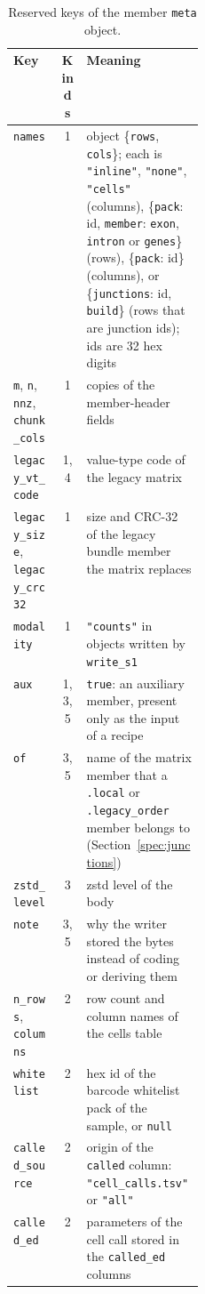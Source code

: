 \begin{table}[htbp]
\centering\footnotesize\setlength{\tabcolsep}{4pt}
\caption{Reserved keys of the member \texttt{meta} object.}
\label{spec:tab:meta}
\begin{tabularx}{\linewidth}{@{}>{\raggedright\arraybackslash}p{0.25\linewidth}cX@{}}
\toprule
Key & Kinds & Meaning \\
\midrule
\texttt{names} & 1 & object \{\texttt{rows}, \texttt{cols}\}; each is \texttt{"inline"}, \texttt{"none"}, \texttt{"cells"} (columns), \{\texttt{pack}: id, \texttt{member}: \texttt{exon}, \texttt{intron} or \texttt{genes}\} (rows), \{\texttt{pack}: id\} (columns), or \{\texttt{junctions}: id, \texttt{build}\} (rows that are junction ids); ids are 32 hex digits \\
\texttt{m}, \texttt{n}, \texttt{nnz}, \texttt{chunk\_cols} & 1 & copies of the member-header fields \\
\texttt{legacy\_vt\_code} & 1, 4 & value-type code of the legacy matrix \\
\texttt{legacy\_size}, \texttt{legacy\_crc32} & 1 & size and CRC-32 of the legacy bundle member the matrix replaces \\
\texttt{modality} & 1 & \texttt{"counts"} in objects written by \texttt{write\_s1} \\
\texttt{aux} & 1, 3, 5 & \texttt{true}: an auxiliary member, present only as the input of a recipe \\
\texttt{of} & 3, 5 & name of the matrix member that a \texttt{.local} or \texttt{.legacy\_order} member belongs to (Section~\ref{spec:junctions}) \\
\texttt{zstd\_level} & 3 & zstd level of the body \\
\texttt{note} & 3, 5 & why the writer stored the bytes instead of coding or deriving them \\
\texttt{n\_rows}, \texttt{columns} & 2 & row count and column names of the cells table \\
\texttt{whitelist} & 2 & hex id of the barcode whitelist pack of the sample, or \texttt{null} \\
\texttt{called\_source} & 2 & origin of the \texttt{called} column: \texttt{"cell\_calls.tsv"} or \texttt{"all"} \\
\texttt{called\_ed} & 2 & parameters of the cell call stored in the \texttt{called\_ed} columns \\

\end{tabularx}
\end{table}

